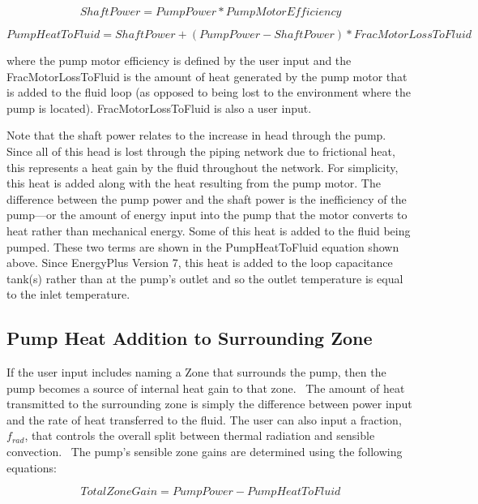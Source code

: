 \begin{equation}
ShaftPower = PumpPower * PumpMotorEfficiency
\end{equation}

\begin{equation}
PumpHeatToFluid = ShaftPower + \left( {PumpPower - ShaftPower} \right) * FracMotorLossToFluid
\end{equation}

where the pump motor efficiency is defined by the user input and the FracMotorLossToFluid is the amount of heat generated by the pump motor that is added to the fluid loop (as opposed to being lost to the environment where the pump is located). FracMotorLossToFluid is also a user input.

Note that the shaft power relates to the increase in head through the pump. Since all of this head is lost through the piping network due to frictional heat, this represents a heat gain by the fluid throughout the network. For simplicity, this heat is added along with the heat resulting from the pump motor. The difference between the pump power and the shaft power is the inefficiency of the pump---or the amount of energy input into the pump that the motor converts to heat rather than mechanical energy. Some of this heat is added to the fluid being pumped. These two terms are shown in the PumpHeatToFluid equation shown above. Since EnergyPlus Version 7, this heat is added to the loop capacitance tank(s) rather than at the pump's outlet and so the outlet temperature is equal to the inlet temperature.

\subsection{Pump Heat Addition to Surrounding Zone}\label{pump-heat-addition-to-surrounding-zone}

If the user input includes naming a Zone that surrounds the pump, then the pump becomes a source of internal heat gain to that zone.~ The amount of heat transmitted to the surrounding zone is simply the difference between power input and the rate of heat transferred to the fluid. The user can also input a fraction, \({f_{rad}}\), that controls the overall split between thermal radiation and sensible convection.~ The pump's sensible zone gains are determined using the following equations:

\begin{equation}
TotalZoneGain = PumpPower - PumpHeatToFluid
\end{equation}

